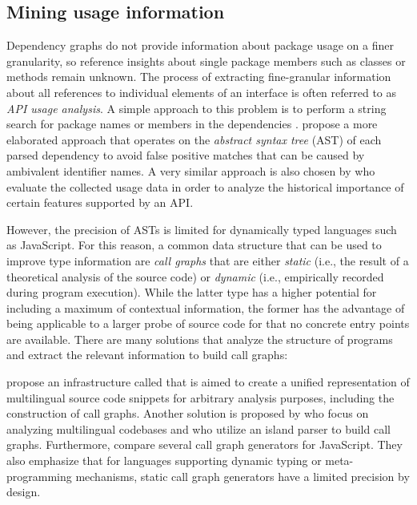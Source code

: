 \subsection{Mining usage information}
\label{sec:related_work/usage_information}

Dependency graphs do not provide information about package usage on a finer granularity, so reference insights about single package members such as classes or methods remain unknown.
The process of extracting fine-granular information about all references to individual elements of an interface is often referred to as \emph{API usage analysis}.
A simple approach to this problem is to perform a string search for package names or members in the dependencies \citep{mileva2010mining}.
\citet{qiu2016understanding} propose a more elaborated approach that operates on the \emph{abstract syntax tree} (AST) of each parsed dependency to avoid false positive matches that can be caused by ambivalent identifier names.
A very similar approach is also chosen by \citet{sawant2017fine} who evaluate the collected usage data in order to analyze the historical importance of certain features supported by an API.

However, the precision of ASTs is limited for dynamically typed languages such as JavaScript.
For this reason, a common data structure that can be used to improve type information are \emph{call graphs} that are either \emph{static} (i.e., the result of a theoretical analysis of the source code) or \emph{dynamic} (i.e., empirically recorded during program execution).
While the latter type has a higher potential for including a maximum of contextual information, the former has the advantage of being applicable to a larger probe of source code for that no concrete entry points are available.
There are many solutions that analyze the structure of programs and extract the relevant information to build call graphs:

\citet{collard2013srcml} propose an infrastructure called  that is aimed to create a unified representation of multilingual source code snippets for arbitrary analysis purposes, including the construction of call graphs.
Another solution is proposed by \citet{bogar2018lightweight} who focus on analyzing multilingual codebases and who utilize an island parser to build call graphs.
Furthermore, \citet{antal2018static} compare several call graph generators for JavaScript.
They also emphasize that for languages supporting dynamic typing or meta-programming mechanisms, static call graph generators have a limited precision by design.

